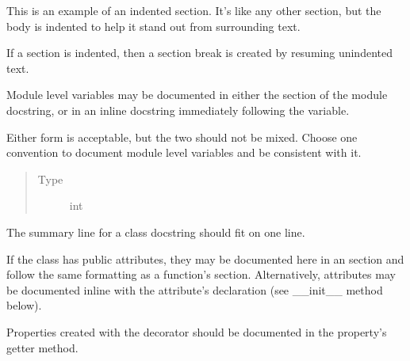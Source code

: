 \documentclass[letterpaper,10pt,english]{sphinxmanual}
\begin{document}
\begin{description}
This is an example of an indented section. It’s like any other section,
but the body is indented to help it stand out from surrounding text.

If a section is indented, then a section break is created by
resuming unindented text.

\begin{fulllineitems}
\label{\detokenize{autogen:example_docstring.module_level_variable1}}
Module level variables may be documented in either the 
section of the module docstring, or in an inline docstring immediately
following the variable.

Either form is acceptable, but the two should not be mixed. Choose
one convention to document module level variables and be consistent
with it.
\begin{quote}\begin{description}
\item[{Type}] \leavevmode
int

\end{description}\end{quote}

\end{fulllineitems}


\begin{fulllineitems}
\label{\detokenize{autogen:example_docstring.ExampleClass}}
The summary line for a class docstring should fit on one line.

If the class has public attributes, they may be documented here
in an  section and follow the same formatting as a
function’s  section. Alternatively, attributes may be documented
inline with the attribute’s declaration (see \_\_init\_\_ method below).

Properties created with the  decorator should be documented
in the property’s getter method.


\end{fulllineitems}
\end{description}
\end{document}

